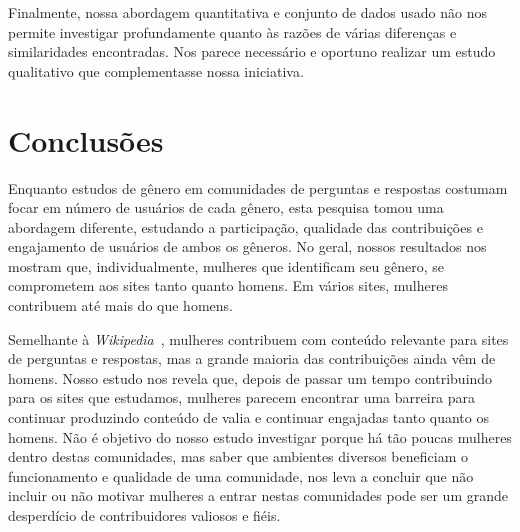 
Finalmente, nossa abordagem quantitativa e conjunto de dados usado não nos permite investigar profundamente quanto às razões de várias diferenças e similaridades encontradas. Nos parece necessário e oportuno realizar um estudo qualitativo que complementasse nossa iniciativa.

\chapter{Conclusões}


Enquanto estudos de gênero em comunidades de perguntas e respostas costumam focar em número de usuários de cada gênero, esta pesquisa tomou uma abordagem diferente, estudando a participação, qualidade das contribuições e engajamento de usuários de ambos os gêneros. No geral, nossos resultados nos mostram que, individualmente, mulheres que identificam seu gênero, se comprometem aos sites tanto quanto homens. Em vários sites, mulheres contribuem até mais do que homens.


Semelhante à \emph{Wikipedia}~\cite{lam2011wp}, mulheres contribuem com conteúdo relevante para sites de perguntas e respostas, mas a grande maioria das contribuições ainda vêm de homens. Nosso estudo nos revela que, depois de passar um tempo contribuindo para os sites que estudamos, mulheres parecem encontrar uma barreira para continuar produzindo conteúdo de valia e continuar engajadas tanto quanto os homens. Não é objetivo do nosso estudo investigar porque há tão poucas mulheres dentro destas comunidades, mas saber que ambientes diversos beneficiam o funcionamento e qualidade de uma comunidade, nos leva a concluir que não incluir ou não motivar mulheres a entrar nestas comunidades pode ser um grande desperdício de contribuidores valiosos e fiéis.

